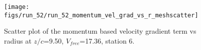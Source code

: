 \begin{figure}[H]
\centering
\texttt{[image: figs/run\_52/run\_52\_momentum\_vel\_grad\_vs\_r\_meshscatter]}
\caption{Scatter plot of the momentum based velocity gradient term vs radius at $z/c$=9.50, $V_{free}$=17.36, station 6.}
\label{fig:run_52_momentum_vel_grad_vs_r_meshscatter}
\end{figure}


